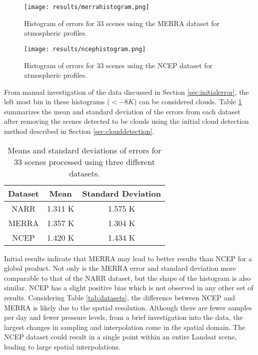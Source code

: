 \documentclass{book}
\begin{document}
\begin{figure}[H]
\centering
\texttt{[image: results/merrahistogram.png]}
\caption{Histogram of errors for 33 scenes using the MERRA dataset for atmospheric profiles.}
\label{fig:merrahistogram}
\end{figure}

\begin{figure}[H]
\centering
\texttt{[image: results/ncephistogram.png]}
\caption{Histogram of errors for 33 scenes using the NCEP dataset for atmospheric profiles.}
\label{fig:ncephistogram}
\end{figure}

From manual investigation of the data discussed in Section \ref{sec:initialerror}, the left most bin in these histograms ($<-8 K$) can be considered clouds.  Table \ref{tab:globalerrors} summarizes the mean and standard deviation of the errors from each dataset after removing the scenes detected to be clouds using the initial cloud detection method described in Section \ref{sec:clouddetection}.

\begin{table}[H]
\begin{center}
\begin{tabular}{|c | c | c |}
\hline
Dataset & Mean & Standard Deviation \\ \hline
NARR & 1.311 K & 1.575 K \\ \hline
MERRA & 1.357 K & 1.304 K \\ \hline
NCEP & 1.420 K & 1.434 K \\ \hline
\end{tabular}
\caption{Means and standard deviations of errors for 33 scenes processed using three different datasets.}
\label{tab:globalerrors}
\end{center}
\end{table}

Initial results indicate that MERRA may lead to better results than NCEP for a global product.  Not only is the MERRA error and standard deviation more comparable to that of the NARR dataset, but the shape of the histogram is also similar.  NCEP has a slight positive bias which is not observed in any other set of results.  Considering Table \ref{tab:datasets}, the difference between NCEP and MERRA is likely due to the spatial resolution.  Although there are fewer samples per day and fewer pressure levels, from a brief investigation into the data, the largest changes in sampling and interpolation come in the spatial domain.  The NCEP dataset could result in a  single point within an entire Landsat scene, leading to large spatial interpolations.
\end{document}
